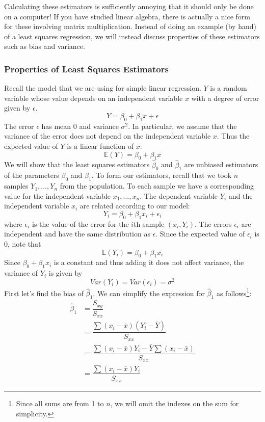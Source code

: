 \documentclass[12pt]{article}
\theoremstyle{definition}
\theoremstyle{remark}
\def\E{{\mathbb E}}
\begin{document}
Calculating these estimators is sufficiently annoying that it should only be done on a computer! If you have studied linear algebra, there is actually a nice form for these involving matrix multiplication. Instead of doing an example (by hand) of a least squares regression, we will instead discuss properties of these estimators such as bias and variance.

\subsubsection{Properties of Least Squares Estimators}

Recall the model that we are using for simple linear regression. $Y$ is a random variable whose value depends on an independent variable $x$ with a degree of error given by $\epsilon$.
\[
Y = \beta_0 + \beta_1 x + \epsilon
\]
The error $\epsilon$ has mean 0 and variance $\sigma^2$. In particular, we assume that the variance of the error does not depend on the independent variable $x$. Thus the expected value of $Y$ is a linear function of $x$:
\[
\E(Y) = \beta_0 + \beta_1 x
\]
We will show that the least squares estimators $\hat{\beta}_0$ and $\hat{\beta}_1$ are unbiased estimators of the parameters $\beta_0$ and $\beta_1$. To form our estimators, recall that we took $n$ samples $Y_1, \dots, Y_n$ from the population. To each sample we have a corresponding value for the independent variable $x_1, \dots, x_n$. The dependent variable $Y_i$ and the independent variable $x_i$ are related according to our model:
\[
Y_i = \beta_0 + \beta_1 x_i + \epsilon_i
\]
where $\epsilon_i$ is the value of the error for the $i$th sample $(x_i, Y_i)$. The errors $\epsilon_i$ are independent and have the same distribution as $\epsilon$. Since the expected value of $\epsilon_i$ is 0, note that
\[
\E(Y_i) = \beta_0 + \beta_1 x_i
\]
Since $\beta_0 + \beta_1 x_i$ is a constant and thus adding it does not affect variance, the variance of $Y_i$ is given by
\[
Var(Y_i) = Var(\epsilon_i) = \sigma^2
\]
First let's find the bias of $\hat{\beta}_1$. We can simplify the expression for $\hat{\beta}_1$ as follows\footnote{Since all sums are from 1 to $n$, we will omit the indexes on the sum for simplicity.}:
\begin{align*}
\hat{\beta}_1 &= \dfrac{S_{xy}}{S_{xx}} \\
&= \dfrac{ \sum (x_i - \bar{x})(Y_i - \bar{Y}) }{S_{xx}} \\
&= \dfrac{ \sum (x_i - \bar{x})Y_i - \bar{Y} \sum (x_i - \bar{x}) }{S_{xx}}\\
&= \dfrac{ \sum (x_i - \bar{x})Y_i }{S_{xx}}
\end{align*}
\end{document}
